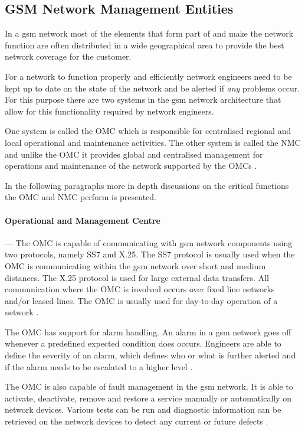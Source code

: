 \subsection{GSM Network Management Entities}
In a \gls{gsm} network most of the elements that form part of and make the network function are often distributed in a wide geographical area to provide the best network coverage for the customer\cite{GSMSysEngin}. 

For a network to function properly and efficiently network engineers need to be kept up to date on the state of the network and be alerted if \emph{any} problems occur\cite{GSMSysEngin}. For this purpose there are two systems in the \gls{gsm} network architecture that allow for this functionality required by network engineers\cite{GSMSysEngin}. 

One system is called the \gls{OMC} which is responsible for centralised regional and local operational and maintenance activities\cite{GSMSysEngin}. The other system is called the \gls{NMC} and unlike the \gls{OMC} it provides global and centralised management for operations and maintenance of the network supported by the OMCs \cite{GSMSysEngin}.

In the following paragraphs more in depth discussions on the critical functions the \gls{OMC} and \gls{NMC} perform is presented.

\paragraph{Operational and Management Centre}
--- The \gls{OMC} is capable of communicating with \gls{gsm} network components using two protocols, namely SS7 and X.25\cite{GSMSysEngin}. The SS7 protocol is usually used when the \gls{OMC} is communicating within the \gls{gsm} network over short and medium distances\cite{GSMSysEngin}. The X.25 protocol is used for large external data transfers\cite{GSMSysEngin}. All communication where the \gls{OMC} is involved occurs over fixed line networks and/or leased lines. The \gls{OMC} is usually used for day-to-day operation of a network \cite{GSMSysEngin}.

The \gls{OMC} has support for alarm handling\cite{GSMSysEngin}. An alarm in a \gls{gsm} network goes off whenever a predefined expected condition does occurs. Engineers are able to define the severity of an alarm, which defines who or what is further alerted and if the alarm needs to be escalated to a higher level \cite{GSMSysEngin}.

The \gls{OMC} is also capable of fault management in the \gls{gsm} network\cite{GSMSysEngin}. It is able to activate, deactivate, remove and restore a service manually or automatically on network devices\cite{GSM92}. Various tests can be run and diagnostic information can be retrieved on the network devices to detect any current or future defects \cite{GSMSysEngin}.

